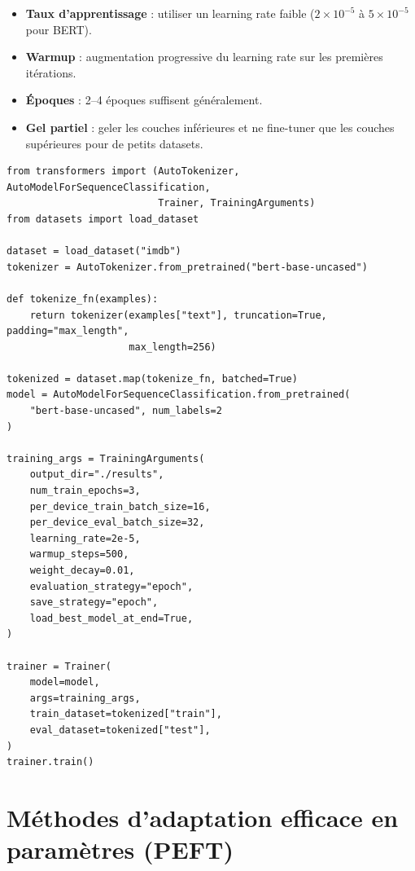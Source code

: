 \begin{bonnepratique}[title=\textbf{Strat\'egies de fine-tuning}]
\begin{itemize}
    \item \textbf{Taux d'apprentissage} : utiliser un learning rate faible
          ($2\times 10^{-5}$ \`a $5\times 10^{-5}$ pour BERT).
    \item \textbf{Warmup} : augmentation progressive du learning rate sur les
          premi\`eres it\'erations.
    \item \textbf{\'Epoques} : 2--4 \'epoques suffisent g\'en\'eralement.
    \item \textbf{Gel partiel} : geler les couches inf\'erieures et ne
          fine-tuner que les couches sup\'erieures pour de petits datasets.
\end{itemize}
\end{bonnepratique}

\begin{codeblock}[title=\textbf{Fine-tuning BERT avec Hugging Face Trainer}]
\begin{verbatim}
from transformers import (AutoTokenizer, AutoModelForSequenceClassification,
                          Trainer, TrainingArguments)
from datasets import load_dataset

dataset = load_dataset("imdb")
tokenizer = AutoTokenizer.from_pretrained("bert-base-uncased")

def tokenize_fn(examples):
    return tokenizer(examples["text"], truncation=True, padding="max_length",
                     max_length=256)

tokenized = dataset.map(tokenize_fn, batched=True)
model = AutoModelForSequenceClassification.from_pretrained(
    "bert-base-uncased", num_labels=2
)

training_args = TrainingArguments(
    output_dir="./results",
    num_train_epochs=3,
    per_device_train_batch_size=16,
    per_device_eval_batch_size=32,
    learning_rate=2e-5,
    warmup_steps=500,
    weight_decay=0.01,
    evaluation_strategy="epoch",
    save_strategy="epoch",
    load_best_model_at_end=True,
)

trainer = Trainer(
    model=model,
    args=training_args,
    train_dataset=tokenized["train"],
    eval_dataset=tokenized["test"],
)
trainer.train()
\end{verbatim}
\end{codeblock}

\section{M\'ethodes d'adaptation efficace en param\`etres (PEFT)}
\label{sec:ft:peft}

